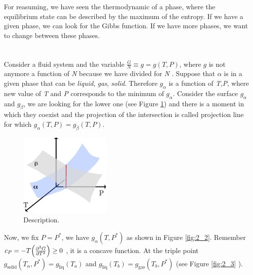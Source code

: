 \documentclass[../main/main.tex]{subfiles}
\begin{document}
For reasuming, we have seen the thermodynamic of a phase, where the equilibrium state can be described by the maximum of the entropy. If we have a given phase, we can look for the Gibbs function. If we have more phases, we want to change between these phases.

\section{}

Consider a fluid system and the variable \( \frac{G}{N} \equiv g = g (T,P) \), where \( g \) is not anymore a function of \emph{N}  because we have divided for \emph{N} . Suppose that \( \alpha  \) is in a given phase that can be \emph{liquid}, \emph{gas}, \emph{solid}. Therefore \( g_ \alpha  \)  is a function of \emph{T,P}, where new value of \emph{T}  and \emph{P}  corresponds to the minimum of \( g_ \alpha \). Consider the surface \( g_ \alpha  \) and
\( g_ \beta  \), we are looking for the lower one (see Figure \ref{fig:2_1}) and there is a moment in which they coexist and the projection of the intersection is called projection line for which \( g_ \alpha(T,P) = g_ \beta(T,P) \).


\begin{figure}[h!]
\centering
\includegraphics[width=0.4\textwidth]{../lessons/2_image/1.pdf}
\caption{\label{fig:2_1} Description.}
\end{figure}

\noindent Now, we fix \( P = P^* \), we have \( g_ \alpha (T,P^*) \) as shown in Figure \ref{fig:2_2}. Remember \( c_P = - T \qty(\pdv[2]{G}{T}) \ge 0 \) , it is a concave function.
At the triple point \( g_{\text{solid}}(T_ \alpha, P^*) = g_{\text{liq}}(T_a) \) and \( g_{\text{liq}}(T_b) = g_{\text{gas}}(T_b , P^*) \) (see Figure \ref{fig:2_3} ).
\end{document}
